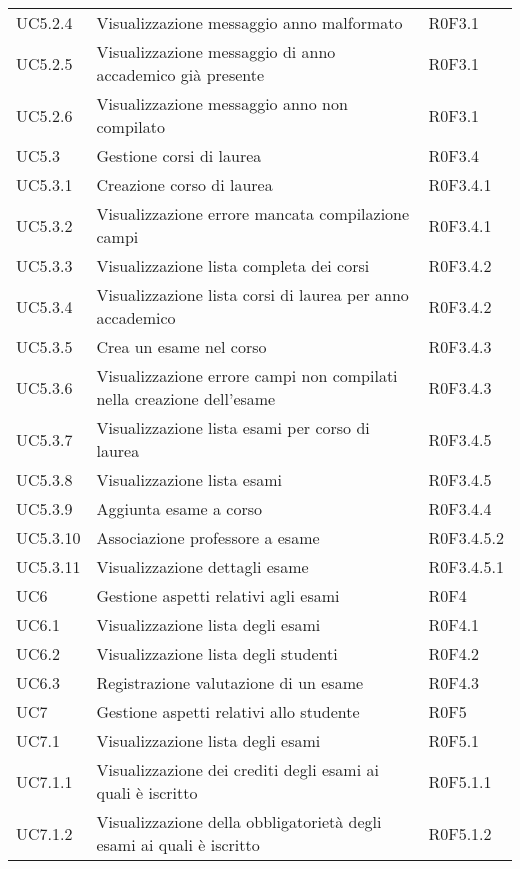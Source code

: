 \documentclass[AnalisiDeiRequisiti.tex]{subfiles}
\begin{document}
\begin{longtable}[H]{p{2cm}p{5cm}p{5cm}}
	UC5.2.4 & Visualizzazione messaggio anno malformato & R0F3.1 \\  
	UC5.2.5 & Visualizzazione messaggio di anno accademico già presente & R0F3.1 \\  
	UC5.2.6 & Visualizzazione messaggio anno non compilato &  R0F3.1 \\  
	UC5.3 & Gestione corsi di laurea &  R0F3.4 \\   
	UC5.3.1 & Creazione corso di laurea &  R0F3.4.1 \\  
	UC5.3.2 & Visualizzazione errore mancata compilazione campi & R0F3.4.1 \\  
	UC5.3.3 & Visualizzazione lista completa dei corsi &  R0F3.4.2 \\  
	UC5.3.4 & Visualizzazione lista corsi di laurea per anno accademico & R0F3.4.2  \\  
	UC5.3.5 & Crea un esame nel corso &  R0F3.4.3\\  
	UC5.3.6 & Visualizzazione errore campi non compilati nella creazione dell'esame & R0F3.4.3  \\  
	UC5.3.7 & Visualizzazione lista esami per corso di laurea & R0F3.4.5 \\  
	UC5.3.8 & Visualizzazione lista esami &  R0F3.4.5 \\  
	UC5.3.9 & Aggiunta esame a corso &  R0F3.4.4 \\  
	UC5.3.10 & Associazione professore a esame & R0F3.4.5.2 \\  
	UC5.3.11 & Visualizzazione dettagli esame & R0F3.4.5.1 \\  
	UC6 & Gestione aspetti relativi agli esami & R0F4 \\  
	UC6.1 & Visualizzazione lista degli esami & R0F4.1 \\  
	UC6.2 & Visualizzazione lista degli studenti & R0F4.2  \\  
	UC6.3 & Registrazione valutazione di un esame & R0F4.3 \\  
	UC7 & Gestione aspetti relativi allo studente & R0F5 \\  
	UC7.1 & Visualizzazione lista degli esami & R0F5.1 \\  
	UC7.1.1 & Visualizzazione dei crediti degli esami ai quali è iscritto & R0F5.1.1 \\  
	UC7.1.2 & Visualizzazione della obbligatorietà degli esami ai quali è iscritto & R0F5.1.2 \\  

\end{longtable}
\end{document}
